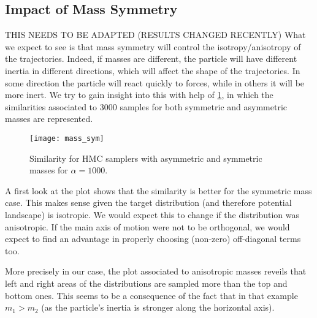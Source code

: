 \documentclass[a4paper, 12pt,oneside]{article}
\begin{document}
			\subsection{Impact of Mass Symmetry}
			THIS NEEDS TO BE ADAPTED (RESULTS CHANGED RECENTLY)
			What we expect to see is that mass symmetry will control the isotropy/anisotropy of the trajectories. Indeed, if masses are different, the particle will have different inertia in different directions, which will affect the shape of the trajectories. In some direction the particle will react quickly to forces, while in others it will be more inert. We try to gain insight into this with help of  \ref{fig:mass-sym}, in which the similarities associated to 3000 samples for both symmetric and asymmetric masses are represented.
			\begin{figure}[htb]
				\centering
					\vspace{0em}
					\texttt{[image: mass\_sym]}
					\caption{Similarity for HMC samplers with asymmetric and symmetric masses for $\alpha=1000$.}
					\label{fig:mass-sym}
			\end{figure}
			A first look at the plot shows that the similarity is better for the symmetric mass case. This makes sense given the target distribution (and therefore potential landscape) is isotropic. We would expect this to change if the distribution was anisotropic. If the main axis of motion were not to be orthogonal, we would expect to find an advantage in properly choosing (non-zero) off-diagonal terms too. 
			
			More precisely in our case, the plot associated to anisotropic masses reveils that left and right areas of the distributions are sampled more than the top and bottom ones. This seems to be a consequence of the fact that in that example $m_1>m_2$ (as the particle's inertia is stronger along the horizontal axis). 
\end{document}
